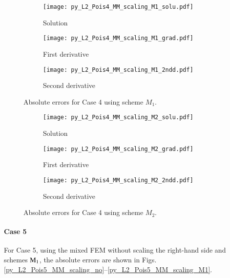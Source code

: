 \documentclass[review,3p]{elsarticle}
\begin{document}
\begin{figure}[!ht]
    \begin{subfigure}{5.5cm}
        \texttt{[image: py\_L2\_Pois4\_MM\_scaling\_M1\_solu.pdf]}
        \caption{Solution}
        \label{py_L2_Pois4_MM_scaling_M1_solu}
    \end{subfigure}
    \hspace{-0.2cm}
    \begin{subfigure}{5.5cm}
        \texttt{[image: py\_L2\_Pois4\_MM\_scaling\_M1\_grad.pdf]}
        \caption{First derivative}
        \label{py_L2_Pois4_MM_scaling_M1_grad}
    \end{subfigure}
    \hspace{-0.2cm}
    \begin{subfigure}{5.5cm}
        \texttt{[image: py\_L2\_Pois4\_MM\_scaling\_M1\_2ndd.pdf]}
        \caption{Second derivative}
        \label{py_L2_Pois4_MM_scaling_M1_2ndd}
    \end{subfigure}
\caption{Absolute errors for Case 4 using scheme $M_1$.}
\label{py_L2_Pois4_MM_scaling_M1}
\end{figure}

\begin{figure}[!ht]
    \begin{subfigure}{5.5cm}
        \texttt{[image: py\_L2\_Pois4\_MM\_scaling\_M2\_solu.pdf]}
        \caption{Solution}
        \label{py_L2_Pois4_MM_scaling_M2_solu}
    \end{subfigure}
    \hspace{-0.2cm}
    \begin{subfigure}{5.5cm}
        \texttt{[image: py\_L2\_Pois4\_MM\_scaling\_M2\_grad.pdf]}
        \caption{First derivative}
        \label{py_L2_Pois4_MM_scaling_M2_grad}
    \end{subfigure}
    \hspace{-0.2cm}
    \begin{subfigure}{5.5cm}
        \texttt{[image: py\_L2\_Pois4\_MM\_scaling\_M2\_2ndd.pdf]}
        \caption{Second derivative}
        \label{py_L2_Pois4_MM_scaling_M2_2ndd}
    \end{subfigure}
\caption{Absolute errors for Case 4 using scheme $M_2$.}
\label{py_L2_Pois4_MM_scaling_M2}
\end{figure}
% 

\newpage
\paragraph{Case 5}
For Case 5, using the mixed FEM without scaling the right-hand side and schemes ${\rm M}_1$, the absolute errors are shown in Figs. \ref{py_L2_Pois5_MM_scaling_no}--\ref{py_L2_Pois5_MM_scaling_M1}.
\end{document}
